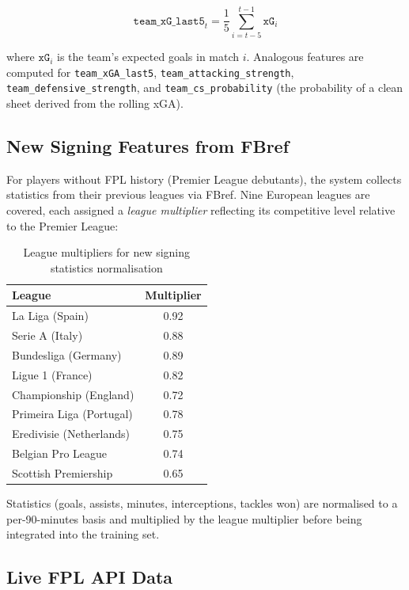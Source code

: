 \begin{equation}
\texttt{team\_xG\_last5}_t = \frac{1}{5} \sum_{i=t-5}^{t-1} \texttt{xG}_i
\end{equation}

where $\texttt{xG}_i$ is the team's expected goals in match $i$. Analogous features are computed for \texttt{team\_xGA\_last5}, \texttt{team\_attacking\_strength}, \texttt{team\_defensive\_strength}, and \texttt{team\_cs\_probability} (the probability of a clean sheet derived from the rolling xGA).

\subsection{New Signing Features from FBref}

For players without FPL history (Premier League debutants), the system collects statistics from their previous leagues via FBref. Nine European leagues are covered, each assigned a \textit{league multiplier} reflecting its competitive level relative to the Premier League:

\begin{table}[h]
\centering
\caption{League multipliers for new signing statistics normalisation}
\label{tab:league_multipliers_en}
\begin{tabular}{lc}
\toprule
\textbf{League} & \textbf{Multiplier} \\
\midrule
La Liga (Spain)              & 0.92 \\
Serie A (Italy)              & 0.88 \\
Bundesliga (Germany)         & 0.89 \\
Ligue 1 (France)             & 0.82 \\
Championship (England)       & 0.72 \\
Primeira Liga (Portugal)     & 0.78 \\
Eredivisie (Netherlands)     & 0.75 \\
Belgian Pro League           & 0.74 \\
Scottish Premiership         & 0.65 \\
\bottomrule
\end{tabular}
\end{table}

Statistics (goals, assists, minutes, interceptions, tackles won) are normalised to a per-90-minutes basis and multiplied by the league multiplier before being integrated into the training set.

\subsection{Live FPL API Data}

